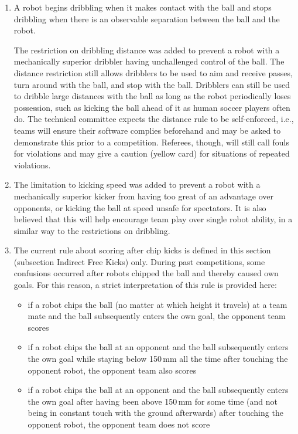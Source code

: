 \begin{enumerate}
\item
A robot begins dribbling when it makes contact with the ball and stops dribbling when there is an observable separation between the ball and the robot.

The restriction on dribbling distance was added to prevent a robot with a mechanically superior dribbler having unchallenged control of the ball.
The distance restriction still allows dribblers to be used to aim and receive passes, turn around with the ball, and stop with the ball.
Dribblers can still be used to dribble large distances with the ball as long as the robot periodically loses possession, such as kicking the ball ahead of it as human soccer players often do.
The technical committee expects the distance rule to be self-enforced, i.e., teams will ensure their software complies beforehand and may be asked to demonstrate this prior to a competition.
Referees, though, will still call fouls for violations and may give a caution (yellow card) for situations of repeated violations.

\item
The limitation to kicking speed was added to prevent a robot with a mechanically superior kicker from having too great of an advantage over opponents, or kicking the ball at speed unsafe for spectators.
It is also believed that this will help encourage team play over single robot ability, in a similar way to the restrictions on dribbling.

\item
The current rule about scoring after chip kicks is defined in this section (subsection Indirect Free Kicks) only.
During past competitions, some confusions occurred after robots chipped the ball and thereby caused own goals.
For this reason, a strict interpretation of this rule is provided here:
\begin{itemize}
\item if a robot chips the ball (no matter at which height it travels) at a team mate and the ball subsequently enters the own goal, the opponent team scores
\item if a robot chips the ball at an opponent and the ball subsequently enters the own goal while staying below 150\,mm all the time after touching the opponent robot, the opponent team also scores
\item if a robot chips the ball at an opponent and the ball subsequently enters the own goal after having been above 150\,mm for some time (and not being in constant touch with the ground afterwards) after touching the opponent robot, the opponent team does not score
\end{itemize}


\end{enumerate}
